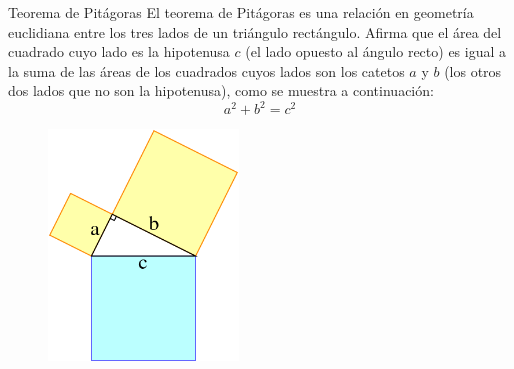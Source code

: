 \begin{infocard}{Teorema de Pitágoras}
    El teorema de Pitágoras es una relación en geometría euclidiana entre los tres lados de un triángulo rectángulo.
    Afirma que el área del cuadrado cuyo lado es la hipotenusa $c$ (el lado opuesto al ángulo recto) es igual a la suma de las áreas de los cuadrados cuyos lados son los catetos $a$ y $b$ (los otros dos lados que no son la hipotenusa), como se muestra a continuación:
    \[a^2+b^2=c^2\]
    \begin{figure}
        \includegraphics[width=0.45\textwidth]{../images/pythagorean_right_angle}
        \caption{}
        \label{fig:pythagorean_right_angle}
    \end{figure}











\end{infocard}